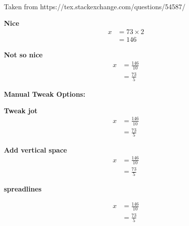 \documentclass{article}
\begin{document}
Taken from https://tex.stackexchange.com/questions/54587/

\begin{minipage}[t]{0.20\linewidth}
\textbf{Nice}
\begin{align*}
 x &= 73 \times 2\\
   &= 146
\end{align*}
\end{minipage}%


%
\begin{minipage}[t]{0.25\linewidth}
\textbf{Not so nice}
\begin{align*}
 x &= \frac{146}{10}\\
   &= \frac{73}{5}
\end{align*}
\end{minipage}%


\bigskip\par\noindent
\textbf{Manual Tweak Options:}
\medskip\par\noindent
\begin{minipage}[t]{0.25\linewidth}
\textbf{Tweak jot}
\setlength{\jot}{8pt}%
\begin{align*}
 x &= \frac{146}{10}\\
   &= \frac{73}{5}
\end{align*}
\end{minipage}%
%
\begin{minipage}[t]{0.30\linewidth}
\textbf{Add vertical space}
\begin{align*}
 x &= \frac{146}{10}\\[5pt]%
   &= \frac{73}{5}
\end{align*}
\end{minipage}%
%
\begin{minipage}[t]{0.30\linewidth}
\textbf{spreadlines}
\begin{spreadlines}{0.8em}%
\begin{align*}
 x &= \frac{146}{10}\\
   &= \frac{73}{5}
\end{align*}
\end{spreadlines}
\end{minipage}%
\end{document}
